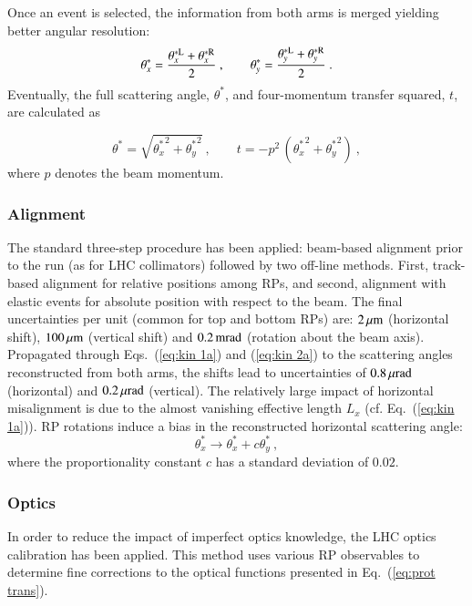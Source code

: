 Once an event is selected, the information from both arms is merged yielding better angular resolution:
\begin{equation}
\label{eq:kin 2a}
	\theta_x^* = {\theta_x^{*\rm L} + \theta_x^{*\rm R} \over 2}\ ,\qquad
	\theta_y^* = {\theta_y^{*\rm L} + \theta_y^{*\rm R} \over 2}\ .
\end{equation}
Eventually, the full scattering angle, $\theta^*$, and four-momentum transfer squared, $t$, are calculated as

\begin{equation}
\label{eq:th t}
	\theta^* = \sqrt{{\theta_x^*}^2 + {\theta_y^*}^2}\ ,\qquad
	t = - p^2\, \left({\theta_x^*}^2 + {\theta_y^*}^2\right)\ ,
\end{equation}
where $p$ denotes the beam momentum.


\subsubsection{Alignment}
\label{sec:alignment}

The standard three-step procedure \cite{totem-ijmp} has been applied: beam-based alignment prior to the run (as for LHC collimators) followed by two off-line methods. First, track-based alignment for relative positions among RPs, and second, alignment with elastic events for absolute position with respect to the beam. The final uncertainties per unit (common for top and bottom RPs) are: $2\,{\rm \mu m}$ (horizontal shift), $100\,{\rm \mu m}$ (vertical shift) and $0.2\,{\rm mrad}$ (rotation about the beam axis). Propagated through Eqs.~(\ref{eq:kin 1a}) and (\ref{eq:kin 2a}) to the scattering angles reconstructed from both arms, the shifts lead to uncertainties of $0.8\,{\rm \mu rad}$ (horizontal) and $0.2\,{\rm \mu rad}$ (vertical). The relatively large impact of horizontal misalignment is due to the almost vanishing effective length $L_x$ (cf. Eq.~(\ref{eq:kin 1a})). RP rotations induce a bias in the reconstructed horizontal scattering angle:
\begin{equation}
\label{eq:alig rot bias}
	\theta_x^* \rightarrow \theta_x^* + c \theta_y^*\ ,
\end{equation}
where the proportionality constant $c$ has a standard deviation of $0.02$.



\subsubsection{Optics}
\label{sec:optics}
%
In order to reduce the impact of imperfect optics knowledge, the LHC optics calibration \cite{totem-optics} has been applied. This method uses various RP observables to determine fine corrections to the optical functions presented in Eq.~(\ref{eq:prot trans}).

